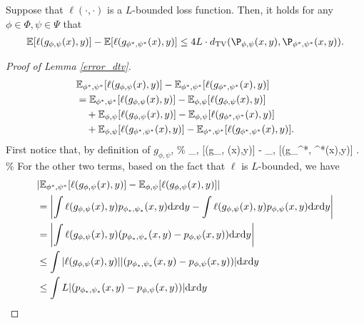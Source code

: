 \begin{lemma} \label{error_dtv}
Suppose that $\ell(\cdot,\cdot)$ is a $L$-bounded loss function. Then, it holds for any $\phi \in \Phi, \psi \in \Psi$ that
\begin{align} 
\mathbb{E}[\ell (g_{\phi, \psi}(x),y)] - \mathbb{E} [\ell (g_{\phi^{*},\psi^{*}}(x),y)] \leq 4L \cdot d_\mathrm{TV} (\P_{\phi,\psi}(x,y),\P_{\phi^{*},\psi^{*}}(x,y)).
\end{align}

\end{lemma}
\begin{proof}[Proof of Lemma \ref{error_dtv}]
\begin{align}\label{092701}
&\mathbb{E}_{\phi^{*}, \psi^{*}} [\ell (g_{\phi, \psi}(x),y)] - \mathbb{E}_{\phi^{*},\psi^{*}} [\ell (g_{\phi^{*},\psi^{*}}(x),y)] \notag \\ 
&=\mathbb{E}_{\phi^{*}, \psi^{*}} [\ell (g_{\phi, \psi}(x),y)] - \mathbb{E}_{\phi, \psi} [\ell (g_{\phi, \psi}(x),y)] \notag \\
&\quad+ \mathbb{E}_{\phi, \psi} [\ell (g_{\phi, \psi}(x),y)] - \mathbb{E}_{\phi, \psi} [\ell (g_{\phi^{*}, \psi^{*}}(x),y)] \notag \\
&\quad+ \mathbb{E}_{\phi, \psi} [\ell (g_{\phi^{*}, \psi^{*}}(x),y)] - \mathbb{E}_{\phi^{*},\psi^{*}} [\ell (g_{\phi^{*},\psi^{*}}(x),y)].
\end{align}
First notice that, by definition of $g_{\phi,\psi}$, 
\%\label{092702}
_{\phi, \psi} [\ell (g_{\phi, \psi}(x),y)] - _{\phi, \psi} [\ell (g_{\phi^{*}, \psi^{*}}(x),y)]  .
\%
For the other two terms, based on the fact that $\ell$ is $L$-bounded, we have
\begin{align}\label{092703}
&|\mathbb{E}_{\phi^{*}, \psi^{*}} [\ell (g_{\phi, \psi}(x),y)] - \mathbb{E}_{\phi, \psi} [\ell (g_{\phi, \psi}(x),y)]| \notag \\ 
&= \left| \int \ell (g_{\phi, \psi}(x),y) p_{\phi_{*}, \psi_{*}} (x,y) \mathrm{d}x\mathrm{d}y - \int \ell (g_{\phi, \psi}(x),y) p_{\phi, \psi} (x,y) \mathrm{d}x\mathrm{d}y \right| \notag \\
&= \left| \int \ell (g_{\phi, \psi}(x),y) (p_{\phi_{*}, \psi_{*}} (x,y)-p_{\phi, \psi} (x,y)) \mathrm{d}x\mathrm{d}y \right| \notag \\
& \leq \int |\ell (g_{\phi, \psi}(x),y)| |(p_{\phi_{*}, \psi_{*}} (x,y)-p_{\phi, \psi} (x,y))| \mathrm{d}x\mathrm{d}y \notag \\
& \leq \int L |(p_{\phi_{*}, \psi_{*}} (x,y)-p_{\phi, \psi} (x,y))| \mathrm{d}x\mathrm{d}y \notag \\

\end{align}
\end{proof}
